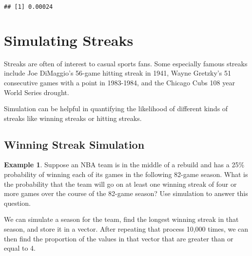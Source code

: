 \documentclass[
  11pt,
]{book}
\theoremstyle{definition}
\theoremstyle{definition}
\newtheorem{example}{Example}[chapter]
\theoremstyle{definition}
\theoremstyle{definition}
\theoremstyle{remark}
\begin{document}
\begin{verbatim}
## [1] 0.00024
\end{verbatim}

\newpage

\hypertarget{simulating-streaks}{%
\section{Simulating Streaks}\label{simulating-streaks}}

Streaks are often of interest to casual sports fans. Some especially famous streaks include Joe DiMaggio's 56-game hitting streak in 1941, Wayne Gretzky's 51 consecutive games with a point in 1983-1984, and the Chicago Cubs 108 year World Series drought.

Simulation can be helpful in quantifying the likelihood of different kinds of streaks like winning streaks or hitting streaks.

\hypertarget{winning-streak-simulation}{%
\subsection{Winning Streak Simulation}\label{winning-streak-simulation}}

\begin{example}
Suppose an NBA team is in the middle of a rebuild and has a 25\% probability of winning each of its games in the following 82-game season. What is the probability that the team will go on at least one winning streak of four or more games over the course of the 82-game season? Use simulation to answer this question.
\end{example}

We can simulate a season for the team, find the longest winning streak in that season, and store it in a vector. After repeating that process 10,000 times, we can then find the proportion of the values in that vector that are greater than or equal to 4.
\end{document}
